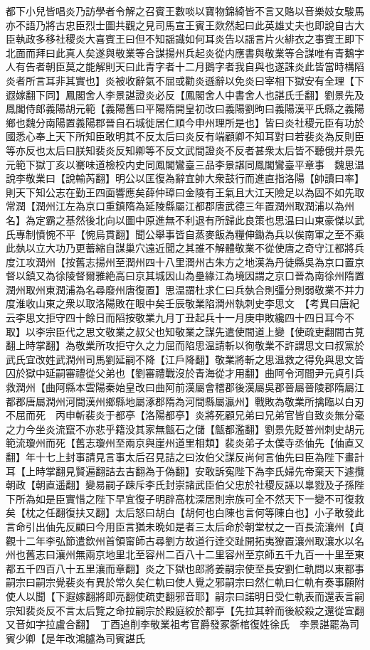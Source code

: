 都下小兒皆唱炎乃訪學者令解之召賓王數啖以寶物錦綺皆不言又賂以音樂妓女駿馬亦不語乃將古忠臣烈士圖共觀之見司馬宣王賓王欻然起曰此英雄丈夫也即說自古大臣執政多移社稷炎大喜賓王曰但不知謡識如何耳炎告以謡言片火緋衣之事賓王即下北面而拜曰此真人矣遂與敬業等合謀揚州兵起炎從内應書與敬業等合謀唯有青鵝字人有告者朝臣莫之能解則天曰此青字者十二月鵝字者我自與也遂誅炎此皆當時構䧟炎者所言耳非其實也】炎被收辭氣不屈或勸炎遜辭以免炎曰宰相下獄安有全理【下遐嫁翻下同】鳳閣舍人李景諶證炎必反【鳳閣舍人中書舍人也諶氏壬翻】劉景先及鳳閣侍郎義陽胡元範【義陽舊曰平陽隋開皇初改曰義陽劉昫曰義陽漢平氏縣之義陽鄉也魏分南陽置義陽郡晉自石城徙居仁順今申州理所是也】皆曰炎社稷元臣有功於國悉心奉上天下所知臣敢明其不反太后曰炎反有端顧卿不知耳對曰若裴炎為反則臣等亦反也太后曰朕知裴炎反知卿等不反文武間證炎不反者甚衆太后皆不聽俄并景先元範下獄丁亥以騫味道檢校内史同鳳閣鸞臺三品李景諶同鳳閣鸞臺平章事　魏思温說李敬業曰【說輸芮翻】明公以匡復為辭宜帥大衆鼓行而進直指洛陽【帥讀曰率】則天下知公志在勤王四面響應矣薛仲璋曰金陵有王氣且大江天險足以為固不如先取常潤【潤州江左為京口重鎮隋為延陵縣屬江都郡唐武德三年置潤州取潤浦以為州名】為定霸之基然後北向以圖中原進無不利退有所歸此良策也思温曰山東豪傑以武氏專制憤惋不平【惋烏貫翻】聞公舉事皆自蒸麥飯為糧伸鋤為兵以俟南軍之至不乘此埶以立大功乃更蓄縮自謀巢穴遠近聞之其誰不解體敬業不從使唐之奇守江都將兵度江攻潤州【按舊志揚州至潤州四十八里潤州古朱方之地漢為丹徒縣吳為京口置京督以鎮又為徐陵督爾雅絶高曰京其城因山為壘緣江為境因謂之京口晉為南徐州隋置潤州取州東潤浦為名尋廢州唐復置】思温謂杜求仁曰兵埶合則彊分則弱敬業不并力度淮收山東之衆以取洛陽敗在眼中矣壬辰敬業陷潤州執刺史李思文　【考異曰唐紀云李思文拒守四十餘日而䧟按敬業九月丁丑起兵十一月庚申敗纔四十四日耳今不取】以李宗臣代之思文敬業之叔父也知敬業之謀先遣使間道上變【使疏吏翻間古莧翻上時掌翻】為敬業所攻拒守久之力屈而陷思温請斬以徇敬業不許謂思文曰叔黨於武氏宜改姓武潤州司馬劉延嗣不降【江戶降翻】敬業將斬之思温救之得免與思文皆囚於獄中延嗣審禮從父弟也【劉審禮戰沒於青海從才用翻】曲阿令河間尹元貞引兵救潤州【曲阿縣本雲陽秦始皇改曰曲阿前漢屬會稽郡後漢屬吳郡晉屬晉陵郡隋屬江都郡唐屬潤州河間漢州鄉縣地屬涿郡隋為河間縣屬瀛州】戰敗為敬業所擒臨以白刃不屈而死　丙申斬裴炎于都亭【洛陽都亭】炎將死顧兄弟曰兄弟官皆自致炎無分毫之力今坐炎流竄不亦悲乎籍没其家無甔石之儲【甔都濫翻】劉景先貶普州刺史胡元範流瓊州而死【舊志瓊州至兩京與崖州道里相類】裴炎弟子太僕寺丞伷先【伷直又翻】年十七上封事請見言事太后召見詰之曰汝伯父謀反尚何言伷先曰臣為陛下畫計耳【上時掌翻見賢遍翻詰去吉翻為于偽翻】安敢訴寃陛下為李氏婦先帝棄天下遽攬朝政【朝直遥翻】變易嗣子踈斥李氏封崇諸武臣伯父忠於社稷反誣以辠戮及子孫陛下所為如是臣實惜之陛下早宜復子明辟高枕深居則宗族可全不然天下一變不可復救矣【枕之任翻復扶又翻】太后怒曰胡白【胡何也白陳也言何等陳白也】小子敢發此言命引出伷先反顧曰今用臣言猶未晩如是者三太后命於朝堂杖之一百長流瀼州【貞觀十二年李弘節遣欽州首領甯師古尋劉方故道行逹交趾開拓夷獠置瀼州取瀼水以名州也舊志曰瀼州無兩京地里北至容州二百八十二里容州至京師五千九百一十里至東都五千四百八十五里瀼而章翻】炎之下獄也郎將姜嗣宗使至長安劉仁軌問以東都事嗣宗曰嗣宗覺裴炎有異於常久矣仁軌曰使人覺之邪嗣宗曰然仁軌曰仁軌有奏事願附使人以聞【下遐嫁翻將即亮翻使疏吏翻邪音耶】嗣宗曰諾明日受仁軌表而還表言嗣宗知裴炎反不言太后覽之命拉嗣宗於殿庭絞於都亭【先拉其幹而後絞殺之還從宣翻又音如字拉盧合翻】　丁酉追削李敬業祖考官爵發冢斵棺復姓徐氏　李景諶罷為司賓少卿【是年改鴻臚為司賓諶氏